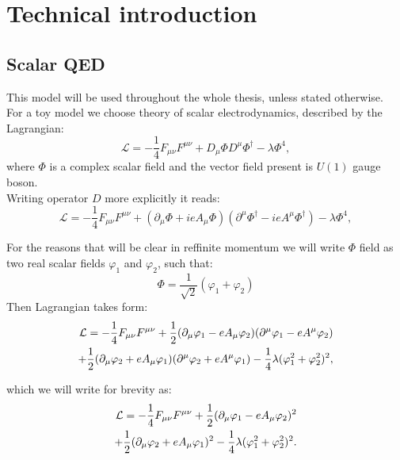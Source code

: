 \chapter{Technical introduction}

\section{Scalar QED}
This model will be used throughout the whole thesis, unless stated otherwise. \\
For a toy model we choose theory of scalar electrodynamics, described by the Lagrangian:
\begin{equation}
\mathcal{L} = -\frac{1}{4}F_{\mu\nu}F^{\mu\nu}+D_\mu\Phi D^\mu\Phi^\dag-\lambda\Phi^4,
\end{equation}
where $\Phi$ is a complex scalar field and the vector field present is $U(1)$ gauge boson. \\

Writing operator $D$ more explicitly it reads:
\begin{equation}
\mathcal{L} = -\frac{1}{4}F_{\mu\nu}F^{\mu\nu}+(\partial_\mu\Phi + ieA_\mu\Phi) 
(\partial^\mu\Phi^\dag-ieA^\mu\Phi^\dag)-\lambda\Phi^4,
\end{equation}

For the reasons that will be clear in ref{finite momentum} we will write $\Phi$ 
field as two real scalar fields 
$\varphi_1$ and $\varphi_2$, such that:
\begin{equation}
\Phi = \frac{1}{\sqrt{2}}(\varphi_1+\varphi_2)
\end{equation}
Then Lagrangian takes form:
\begin{align}
\mathcal{L} = -\frac{1}{4}F_{\mu\nu}F^{\mu\nu}+ \frac{1}{2}(\partial_\mu\varphi_1 - eA_\mu\varphi_2)
(\partial^\mu\varphi_1 - eA^\mu\varphi_2)  \\
+\frac{1}{2}(\partial_\mu\varphi_2+eA_\mu\varphi_1)(\partial^\mu\varphi_2+eA^\mu\varphi_1) 
-\frac{1}{4}\lambda(\varphi_1^2+\varphi_2^2)^2,\notag
\end{align}

which we will write for brevity as:
\begin{align}
\mathcal{L} = -\frac{1}{4}F_{\mu\nu}F^{\mu\nu}+ 
\frac{1}{2}(\partial_\mu\varphi_1 - eA_\mu\varphi_2)^2\\
+\frac{1}{2}(\partial_\mu\varphi_2+eA_\mu\varphi_1)^2
-\frac{1}{4}\lambda(\varphi_1^2+\varphi_2^2)^2. \notag
\end{align}


